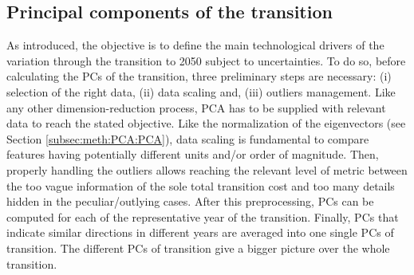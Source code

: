 \subsection{Principal components of the transition}
\label{subsec:meth:PCA:transition}
As introduced, the objective is to define the main technological drivers of the variation through the transition to 2050 subject to uncertainties. To do so, before calculating the PCs of the transition, three preliminary steps are necessary: (i) selection of the right data, (ii) data scaling and, (iii) outliers management. Like any other dimension-reduction process, \gls{PCA} has to be supplied with relevant data to reach the stated objective.  Like the normalization of the eigenvectors (see Section \ref{subsec:meth:PCA:PCA}), data scaling is fundamental to compare features having potentially different units and/or order of magnitude. Then, properly handling the outliers allows reaching the relevant level of metric between the too vague information of the sole total transition cost and too many details hidden in the peculiar/outlying cases. After this preprocessing, PCs can be computed for each of the representative year of the transition. Finally, PCs that indicate similar directions in different years are averaged into one single PCs of transition. The different PCs of transition give a bigger picture over the whole transition.\\

\\

